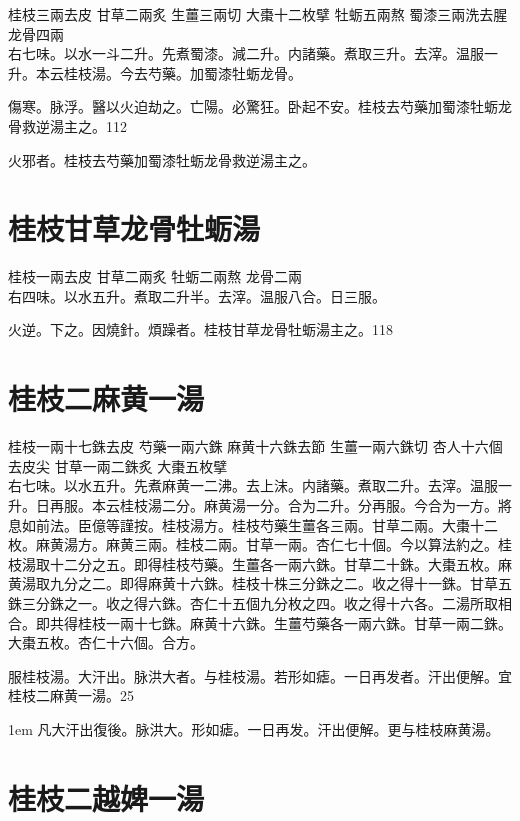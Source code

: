 桂枝{\scriptsize 三兩去皮} 甘草{\scriptsize 二兩炙} 生薑{\scriptsize 三兩切} 大棗{\scriptsize 十二枚擘} 牡蛎{\scriptsize 五兩熬} 蜀漆{\scriptsize 三兩洗去腥} 龙骨{\scriptsize 四兩}\\
右七味。以水一斗二升。先煮蜀漆。減二升。内諸藥。煮取三升。去滓。温服一升。本云桂枝湯。今去芍藥。加蜀漆牡蛎龙骨。

傷寒。脉浮。醫以火迫劫之。亡陽。{\khaaitp 必}驚狂。卧起不安。桂枝去芍藥加蜀漆牡蛎龙骨救逆湯主之。112

火邪者。桂枝去芍藥加蜀漆牡蛎龙骨救逆湯主之。

\section{桂枝甘草龙骨牡蛎湯}

桂枝{\scriptsize 一兩去皮} 甘草{\scriptsize 二兩炙} 牡蛎{\scriptsize 二兩熬} 龙骨{\scriptsize 二兩}\\
右四味。以水五升。煮取二升半。去滓。温服八合。日三服。

火逆。下之。因燒針。煩躁者。桂枝甘草龙骨牡蛎湯主之。118

\section{桂枝二麻黄一湯}

桂枝{\scriptsize 一兩十七銖去皮} 芍藥{\scriptsize 一兩六銖} 麻黄{\scriptsize 十六銖去節} 生薑{\scriptsize 一兩六銖切} 杏人{\scriptsize 十六個去皮尖} 甘草{\scriptsize 一兩二銖炙} 大棗{\scriptsize 五枚擘}\\
右七味。以水五升。先煮麻黄一二沸。去上沫。内諸藥。煮取二升。去滓。温服一升。日再服。本云桂枝湯二分。麻黄湯一分。合为二升。分再服。今合为一方。將息如前法。{\scriptsize 臣億等謹按。桂枝湯方。桂枝芍藥生薑各三兩。甘草二兩。大棗十二枚。麻黄湯方。麻黄三兩。桂枝二兩。甘草一兩。杏仁七十個。今以算法約之。桂枝湯取十二分之五。即得桂枝芍藥。生薑各一兩六銖。甘草二十銖。大棗五枚。麻黄湯取九分之二。即得麻黄十六銖。桂枝十株三分銖之二。收之得十一銖。甘草五銖三分銖之一。收之得六銖。杏仁十五個九分枚之四。收之得十六各。二湯所取相合。即共得桂枝一兩十七銖。麻黄十六銖。生薑芍藥各一兩六銖。甘草一兩二銖。大棗五枚。杏仁十六個。合方。}{\zhaoben}

服桂枝湯。大汗出。脉洪大者。与桂枝湯。若形如瘧。一日再发者。汗出便解。宜桂枝二麻黄一湯。25

\hangindent 1em
凡大汗出復後。脉洪大。形如瘧。一日再发。汗出便解。更与桂枝麻黄湯。{\yixin}

\section{桂枝二越婢一湯}

